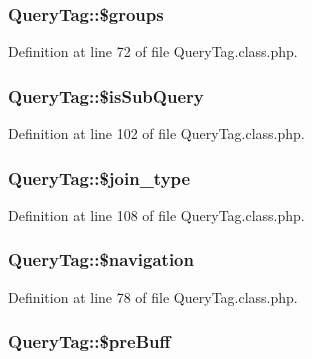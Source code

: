 \hypertarget{classQueryTag_aa456465c5358ae400751727cd943683e}{
\subsubsection[{\$groups}]{\setlength{\rightskip}{0pt plus 5cm}Query\+Tag\+::\$groups}}\label{classQueryTag_aa456465c5358ae400751727cd943683e}


Definition at line 72 of file Query\+Tag.\+class.\+php.

\hypertarget{classQueryTag_ac657cdbbef0ca8f1907197cbf91f1040}{
\subsubsection[{\$is\+Sub\+Query}]{\setlength{\rightskip}{0pt plus 5cm}Query\+Tag\+::\$is\+Sub\+Query}}\label{classQueryTag_ac657cdbbef0ca8f1907197cbf91f1040}


Definition at line 102 of file Query\+Tag.\+class.\+php.

\hypertarget{classQueryTag_a8ab11b51470b725b766e2d53bb947ba4}{
\subsubsection[{\$join\+\_\+type}]{\setlength{\rightskip}{0pt plus 5cm}Query\+Tag\+::\$join\+\_\+type}}\label{classQueryTag_a8ab11b51470b725b766e2d53bb947ba4}


Definition at line 108 of file Query\+Tag.\+class.\+php.

\hypertarget{classQueryTag_a60f53db40ea035c8e9c88ab2681e3792}{
\subsubsection[{\$navigation}]{\setlength{\rightskip}{0pt plus 5cm}Query\+Tag\+::\$navigation}}\label{classQueryTag_a60f53db40ea035c8e9c88ab2681e3792}


Definition at line 78 of file Query\+Tag.\+class.\+php.

\hypertarget{classQueryTag_ac51df39445e0b132d1fa388c01ebf56d}{
\subsubsection[{\$pre\+Buff}]{\setlength{\rightskip}{0pt plus 5cm}Query\+Tag\+::\$pre\+Buff}}\label{classQueryTag_ac51df39445e0b132d1fa388c01ebf56d}


